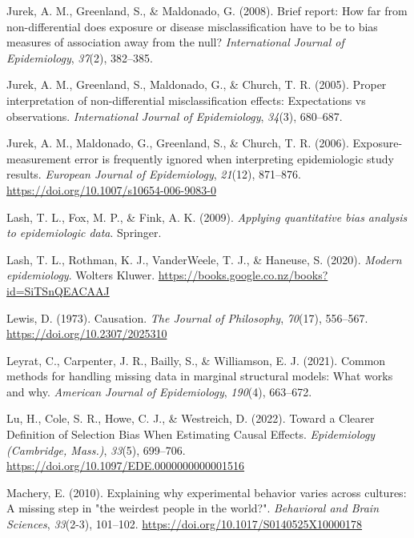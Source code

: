 \documentclass[
  single column]{article}
\newlength{\cslhangindent}
\newenvironment{CSLReferences}[2] %
 {\begin{list}{}{%
  \setlength{\itemindent}{0pt}
  \setlength{\leftmargin}{0pt}
  \setlength{\parsep}{0pt}
  \ifodd #1
   \setlength{\leftmargin}{\cslhangindent}
   \setlength{\itemindent}{-1\cslhangindent}
  \fi
  \setlength{\itemsep}{#2\baselineskip}}}
 {\end{list}}
\begin{document}
\begin{CSLReferences}{1}{0}
Jurek, A. M., Greenland, S., \& Maldonado, G. (2008). Brief report: How
far from non-differential does exposure or disease misclassification
have to be to bias measures of association away from the null?
\emph{International Journal of Epidemiology}, \emph{37}(2), 382--385.

Jurek, A. M., Greenland, S., Maldonado, G., \& Church, T. R. (2005).
Proper interpretation of non-differential misclassification effects:
Expectations vs observations. \emph{International Journal of
Epidemiology}, \emph{34}(3), 680--687.

Jurek, A. M., Maldonado, G., Greenland, S., \& Church, T. R. (2006).
Exposure-measurement error is frequently ignored when interpreting
epidemiologic study results. \emph{European Journal of Epidemiology},
\emph{21}(12), 871--876. \url{https://doi.org/10.1007/s10654-006-9083-0}

Lash, T. L., Fox, M. P., \& Fink, A. K. (2009). \emph{Applying
quantitative bias analysis to epidemiologic data}. Springer.

Lash, T. L., Rothman, K. J., VanderWeele, T. J., \& Haneuse, S. (2020).
\emph{Modern epidemiology}. Wolters Kluwer.
\url{https://books.google.co.nz/books?id=SiTSnQEACAAJ}

Lewis, D. (1973). Causation. \emph{The Journal of Philosophy},
\emph{70}(17), 556--567. \url{https://doi.org/10.2307/2025310}

Leyrat, C., Carpenter, J. R., Bailly, S., \& Williamson, E. J. (2021).
Common methods for handling missing data in marginal structural models:
What works and why. \emph{American Journal of Epidemiology},
\emph{190}(4), 663--672.

Lu, H., Cole, S. R., Howe, C. J., \& Westreich, D. (2022). Toward a
Clearer Definition of Selection Bias When Estimating Causal Effects.
\emph{Epidemiology (Cambridge, Mass.)}, \emph{33}(5), 699--706.
\url{https://doi.org/10.1097/EDE.0000000000001516}

Machery, E. (2010). Explaining why experimental behavior varies across
cultures: A missing step in "the weirdest people in the world?".
\emph{Behavioral and Brain Sciences}, \emph{33}(2-3), 101--102.
\url{https://doi.org/10.1017/S0140525X10000178}


\end{CSLReferences}
\end{document}
